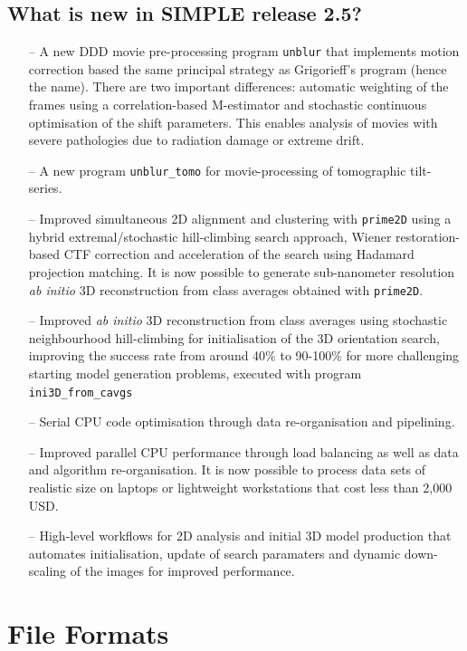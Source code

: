 \documentclass[a4paper,11pt]{article}
\newcommand{\prgname}[1]{\textcolor{NavyBlue}{\texttt{#1}}}
\begin{document}
\subsection{What is new in SIMPLE release 2.5?}
\begin{itemize}
    \item[--] A new DDD movie pre-processing program \prgname{unblur} that implements motion correction based the same principal strategy as Grigorieff's program (hence the name). There are two important differences: automatic weighting of the frames using a correlation-based M-estimator and stochastic continuous optimisation of the shift parameters. This enables analysis of movies with severe pathologies due to radiation damage or extreme drift.
    \item[--] A new program \prgname{unblur\_tomo} for movie-processing of tomographic tilt-series.
    \item[--] Improved simultaneous 2D alignment and clustering with \prgname{prime2D} using a hybrid extremal/stochastic hill-climbing search approach, Wiener restoration-based CTF correction and acceleration of the search using Hadamard projection matching. It is now possible to generate sub-nanometer resolution \textit{ab initio} 3D reconstruction from class averages obtained with  \prgname{prime2D}.
    \item[--] Improved \textit{ab initio} 3D reconstruction from class averages using stochastic neighbourhood hill-climbing for initialisation of the 3D orientation search, improving the success rate from around 40\% to 90-100\% for more challenging starting model generation problems, executed with program \prgname{ini3D\_from\_cavgs}
    \item[--] Serial CPU code optimisation through data re-organisation and pipelining.
    \item[--] Improved parallel CPU performance through load balancing as well as data and algorithm re-organisation. It is now possible to process data sets of realistic size on laptops or lightweight workstations that cost less than 2,000 USD.
    \item[--] High-level workflows for 2D analysis and initial 3D model production that automates initialisation, update of search paramaters and dynamic down-scaling of the images for improved performance.
\end{itemize}

\section{File Formats}
\end{document}
